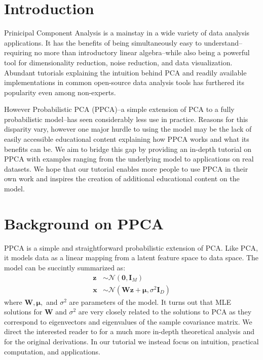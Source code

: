 \section{Introduction}
Prinicipal Component Analysis is a mainstay in a wide variety of data analysis applications. It has the benefits of being simultaneously easy to understand--requiring no more than introductory linear algebra--while also being a powerful tool for dimensionality reduction, noise reduction, and data visualization. Abundant tutorials explaining the intuition behind PCA and readily available implementations in common open-source data analysis tools has furthered its popularity even among non-experts.

However Probabilistic PCA (PPCA)--a simple extension of PCA to a fully probabilistic model--has seen considerably less use in practice. Reasons for this disparity vary, however one major hurdle to using the model may be the lack of easily accessible educational content explaining how PPCA works and what its benefits can be. We aim to bridge this gap by providing an in-depth tutorial on PPCA with examples ranging from the underlying model to applications on real datasets. We hope that our tutorial enables more people to use PPCA in their own work and inspires the creation of additional educational content on the model.

\section{Background on PPCA}
PPCA is a simple and straightforward probabilistic extension of PCA. Like PCA, it models data as a linear mapping from a latent feature space to data space. The model can be succintly summarized as:
\begin{align*}
    \mathbf{z} &\sim \mathcal{N}(\mathbf{0}, \mathbf{I}_{M}) \\
    \mathbf{x} &\sim \mathcal{N}(\mathbf{Wz} + \boldsymbol{\mu}, \sigma^2\mathbf{I}_{D})
\end{align*}
where $\mathbf{W}, \boldsymbol{\mu}, $ and $\sigma^2$ are parameters of the model. It turns out that MLE solutions for $\mathbf{W}$ and $\sigma^2$ are very closely related to the solutions to PCA as they correspond to eigenvectors and eigenvalues of the sample covariance matrix. We direct the interested reader to \citet{bishop2006pattern} for a much more in-depth theoretical analysis and \citet{tipping1999probabilistic} for the original derivations. In our tutorial we instead focus on intuition, practical computation, and applications.




